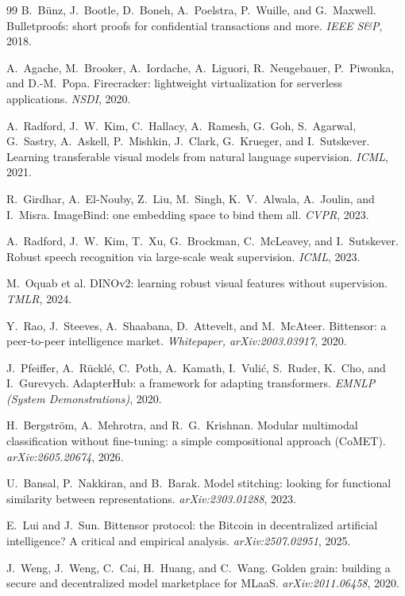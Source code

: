 \documentclass[11pt]{article}
\begin{document}
\begin{thebibliography}{99}
B.~B\"unz, J.~Bootle, D.~Boneh, A.~Poelstra, P.~Wuille, and
G.~Maxwell.
Bulletproofs: short proofs for confidential transactions and more.
\emph{IEEE S\&P}, 2018.

A.~Agache, M.~Brooker, A.~Iordache, A.~Liguori, R.~Neugebauer,
P.~Piwonka, and D.-M.~Popa.
Firecracker: lightweight virtualization for serverless
applications.
\emph{NSDI}, 2020.

A.~Radford, J.~W.~Kim, C.~Hallacy, A.~Ramesh, G.~Goh, S.~Agarwal,
G.~Sastry, A.~Askell, P.~Mishkin, J.~Clark, G.~Krueger, and
I.~Sutskever.
Learning transferable visual models from natural language
supervision.
\emph{ICML}, 2021.

R.~Girdhar, A.~El-Nouby, Z.~Liu, M.~Singh, K.~V.~Alwala, A.~Joulin,
and I.~Misra.
ImageBind: one embedding space to bind them all.
\emph{CVPR}, 2023.

A.~Radford, J.~W.~Kim, T.~Xu, G.~Brockman, C.~McLeavey, and
I.~Sutskever.
Robust speech recognition via large-scale weak supervision.
\emph{ICML}, 2023.

M.~Oquab et al.
DINOv2: learning robust visual features without supervision.
\emph{TMLR}, 2024.

Y.~Rao, J.~Steeves, A.~Shaabana, D.~Attevelt, and M.~McAteer.
Bittensor: a peer-to-peer intelligence market.
\emph{Whitepaper, arXiv:2003.03917}, 2020.

J.~Pfeiffer, A.~R\"uckl\'e, C.~Poth, A.~Kamath, I.~Vuli\'c,
S.~Ruder, K.~Cho, and I.~Gurevych.
AdapterHub: a framework for adapting transformers.
\emph{EMNLP (System Demonstrations)}, 2020.

H.~Bergstr\"om, A.~Mehrotra, and R.~G.~Krishnan.
Modular multimodal classification without fine-tuning: a simple
compositional approach (CoMET).
\emph{arXiv:2605.20674}, 2026.

U.~Bansal, P.~Nakkiran, and B.~Barak.
Model stitching: looking for functional similarity between
representations.
\emph{arXiv:2303.01288}, 2023.

E.~Lui and J.~Sun.
Bittensor protocol: the Bitcoin in decentralized artificial
intelligence? A critical and empirical analysis.
\emph{arXiv:2507.02951}, 2025.

J.~Weng, J.~Weng, C.~Cai, H.~Huang, and C.~Wang.
Golden grain: building a secure and decentralized model marketplace
for MLaaS.
\emph{arXiv:2011.06458}, 2020.


\end{thebibliography}
\end{document}
